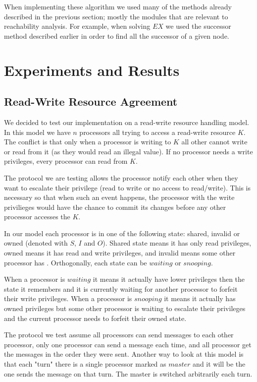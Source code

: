\documentclass[11pt]{article}
\begin{document}
        When implementing these algorithm we used many of the methods already
        described in the previous section; mostly the modules that are relevant
        to reachability analysis. For example, when solving $EX$ we used the
        successor method described earlier in order to find all the successor
        of a given node.

\section{Experiments and Results}
    \subsection{Read-Write Resource Agreement}
        We decided to test our implementation on a read-write resource handling model. In
        this model we have $n$ processors all trying to access a read-write resource $K$. The
        conflict is that only when a processor is writing to $K$ all other cannot write or read
        from it (as they would read an illegal value). If no processor needs a write privileges, 
        every processor can read from $K$.

        The protocol we are testing allows the processor notify each other when they want to escalate
        their privilege (read to write or no access to read/write). This is necessary so that when such
        an event happens, the processor with the write privilieges would have the chance to commit its 
        changes before any other processor accesses the $K$.

        In our model each processor is in one of the following state: shared, invalid or owned 
        (denoted with $S$, $I$ and $O$). Shared state means it has only read privileges, owned 
        means it has read and write privileges, and invalid means some other processor has . Orthogonally, 
        each state can be $waiting$ or $snooping$.

        When a processor is $waiting$ it means it actually have lower privileges then the state it remembers 
        and it is currently waiting for another processor to forfeit their write privileges. When a
        processor is $snooping$ it means it actually has owned privileges but some other processor is waiting 
        to escalate their privileges and the current processor needs to forfeit their owned state.

        The protocol we test assume all processors can send messages to each other processor, only one
        processor can send a message each time, and all processor get the messages in the order they were sent.
        Another way to look at this model is that each "turn" there is a single processor marked as $master$ 
        and it will be the one sends the message on that turn. The master is switched arbitrarily each turn.
\end{document}
